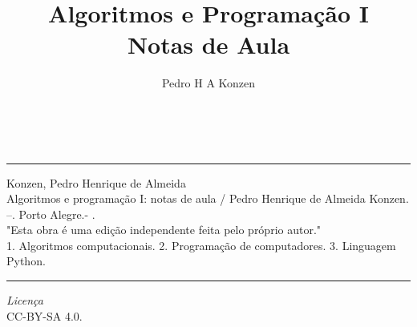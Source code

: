 \documentclass[a4paper,10pt,twoside]{book}
\begin{document}
\frontmatter


\title{Algoritmos e Programação I\\\small{Notas de Aula}}
\author{Pedro H A Konzen}
\date{}
\maketitle

\ifisbook
~
\vspace{4.5in}
\hrule
Konzen, Pedro Henrique de Almeida\\
\indent\hspace{2em}Algoritmos e programação I: notas de aula / Pedro Henrique de Almeida Konzen. --{\the\year}. Porto Alegre.- {\the\year}.\\
\indent\hspace{2em}"Esta obra é uma edição independente feita pelo próprio autor."\\
\indent\hspace{2em}1. Algoritmos computacionais. 2. Programação de computadores. 3. Linguagem Python.\\
\hrule
\vspace{1cm}
\begin{center}
  \textit{Licença}\\CC-BY-SA 4.0.
\end{center}
\fi





\ifishtml
\clearpage
{}
{}
\fi
\tableofcontents


\mainmatter










\clearpage
{}
{}
\theendnotes

\ifisbook
\clearpage
{}
{}
\fi
\end{document}
